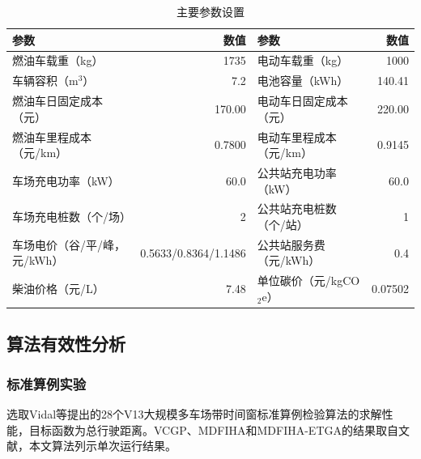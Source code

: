 \documentclass{setp-new}
\begin{document}
\begin{table}[H]
  \centering
  \caption{主要参数设置}
  \label{tab:parameters}
  \small
  \begin{tabular*}{\textwidth}{@{\extracolsep{\fill}}lrlr}
    \toprule
    参数 & 数值 & 参数 & 数值\\
    \midrule
    燃油车载重（kg） & 1735 & 电动车载重（kg） & 1000\\
    车辆容积（m$^3$） & 7.2 & 电池容量（kWh） & 140.41\\
    燃油车日固定成本（元） & 170.00 & 电动车日固定成本（元） & 220.00\\
    燃油车里程成本（元/km） & 0.7800 & 电动车里程成本（元/km） & 0.9145\\
    车场充电功率（kW） & 60.0 & 公共站充电功率（kW） & 60.0\\
    车场充电桩数（个/场） & 2 & 公共站充电桩数（个/站） & 1\\
    车场电价（谷/平/峰，元/kWh） & 0.5633/0.8364/1.1486 & 公共站服务费（元/kWh） & 0.4\\
    柴油价格（元/L） & 7.48 & 单位碳价（元/kgCO$_2$e） & 0.07502\\
    \bottomrule
  \end{tabular*}
\end{table}

\subsection{算法有效性分析}

\subsubsection{标准算例实验}

选取Vidal等提出的28个V13大规模多车场带时间窗标准算例检验算法的求解性能，目标函数为总行驶距离。VCGP、MDFIHA和MDFIHA-ETGA的结果取自文献，本文算法列示单次运行结果。
\end{document}
